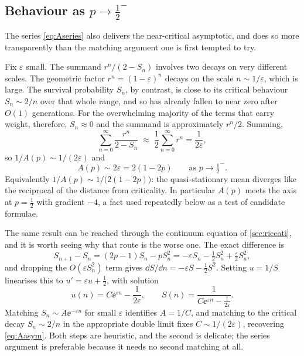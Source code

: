 \subsection{Behaviour as \texorpdfstring{$p\to\tfrac12^-$}{p to 1/2}}
\label{sec:asymptotic}

The series \cref{eq:Aseries} also delivers the near-critical asymptotic, and does
so more transparently than the matching argument one is first tempted to try.

Fix $\varepsilon$ small. The summand $r^n/(2-S_n)$ involves two decays on very
different scales. The geometric factor $r^n = (1-\varepsilon)^n$ decays on the
scale $n\sim1/\varepsilon$, which is large. The survival probability $S_n$, by
contrast, is close to its critical behaviour $S_n\sim2/n$ over that whole range,
and so has already fallen to near zero after $O(1)$ generations. For the
overwhelming majority of the terms that carry weight, therefore, $S_n\approx0$ and
the summand is approximately $r^n/2$. Summing,
\begin{equation*}
\sum_{n=0}^{\infty}\frac{r^n}{2-S_n}
\;\approx\;
\frac12\sum_{n=0}^{\infty}r^n = \frac{1}{2\varepsilon},
\end{equation*}
so $1/A(p)\sim1/(2\varepsilon)$ and
\begin{equation}
\label{eq:Aasym}
\boxed{\;A(p)\sim2\varepsilon = 2(1-2p)\qquad\text{as }p\to\tfrac12^-.\;}
\end{equation}
Equivalently $1/A(p)\sim1/\bigl(2(1-2p)\bigr)$: the quasi-stationary mean diverges
like the reciprocal of the distance from criticality. In particular $A(p)$ meets
the axis at $p=\tfrac12$ with gradient $-4$, a fact used repeatedly below as a test
of candidate formulae.

The same result can be reached through the continuum equation of
\cref{sec:riccati}, and it is worth seeing why that route is the worse one. The
exact difference is
\begin{equation*}
S_{n+1}-S_n = (2p-1)S_n - pS_n^2
= -\varepsilon S_n - \tfrac12S_n^2 + \tfrac{\varepsilon}{2}S_n^2 ,
\end{equation*}
and dropping the $O(\varepsilon S_n^2)$ term gives
$\dd S/\dd n = -\varepsilon S-\tfrac12S^2$. Setting $u=1/S$ linearises this to
$u' = \varepsilon u+\tfrac12$, with solution
\begin{equation*}
u(n) = C\ee^{\varepsilon n} - \frac{1}{2\varepsilon},
\qquad
S(n) = \frac{1}{C\ee^{\varepsilon n}-\frac{1}{2\varepsilon}} .
\end{equation*}
Matching $S_n\sim A\ee^{-\varepsilon n}$ for small $\varepsilon$ identifies
$A=1/C$, and matching to the critical decay $S_n\sim2/n$ in the appropriate double
limit fixes $C\sim1/(2\varepsilon)$, recovering \cref{eq:Aasym}. Both steps are
heuristic, and the second is delicate; the series argument is preferable because it
needs no second matching at all.

